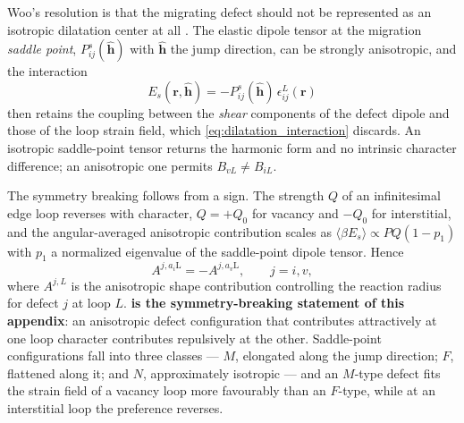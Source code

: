 \documentclass{article}
\newcommand{\aiL}{a_{i}\mathrm{L}}
\newcommand{\avL}{a_{v}\mathrm{L}}
\begin{document}
Woo's resolution is that the migrating defect should not be represented as an
isotropic dilatation center at all \citep{woo1982intrinsic}. The elastic dipole
tensor at the migration \emph{saddle point}, $P^s_{ij}(\hat{\bm h})$ with
$\hat{\bm h}$ the jump direction, can be strongly anisotropic, and the
interaction
\begin{equation}
    E_s(\bm r,\hat{\bm h})=-P_{ij}^{s}(\hat{\bm h})\,\epsilon_{ij}^{L}(\bm r)
    \label{eq:woo_saddle_interaction}
\end{equation}
then retains the coupling between the \emph{shear} components of the defect
dipole and those of the loop strain field, which \cref{eq:dilatation_interaction}
discards. An isotropic saddle-point tensor returns the harmonic form and no
intrinsic character difference; an anisotropic one permits $B_{vL}\neq B_{iL}$.

The symmetry breaking follows from a sign. The strength $Q$ of an infinitesimal
edge loop reverses with character, $Q=+Q_0$ for vacancy and $-Q_0$ for
interstitial, and the angular-averaged anisotropic contribution scales as
$\langle\beta E_s\rangle\propto PQ(1-p_1)$ with $p_1$ a normalized eigenvalue of
the saddle-point dipole tensor. Hence
\begin{equation}
    \boxed{\;A^{j,\aiL}=-A^{j,\avL},\qquad j=i,v,\;}
    \label{eq:A_reversal}
\end{equation}
where $A^{j,L}$ is the anisotropic shape contribution controlling the reaction
radius for defect $j$ at loop $L$. \textbf{ is the
symmetry-breaking statement of this appendix}: an anisotropic defect
configuration that contributes attractively at one loop character contributes
repulsively at the other. Saddle-point configurations fall into three classes ---
$M$, elongated along the jump direction; $F$, flattened along it; and $N$,
approximately isotropic --- and an $M$-type defect fits the strain field of a
vacancy loop more favourably than an $F$-type, while at an interstitial loop the
preference reverses.
\end{document}

